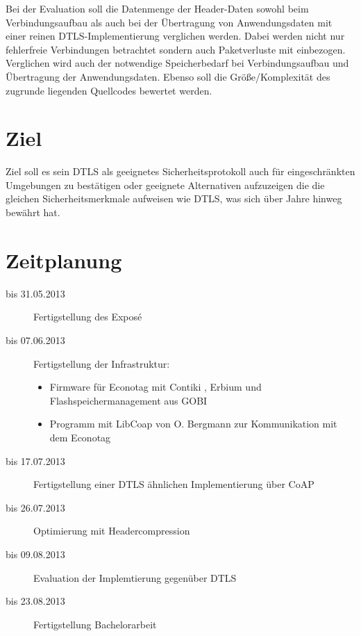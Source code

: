 \documentclass[a4paper,10pt]{report}
\begin{document}
Bei der Evaluation soll die Datenmenge der Header-Daten sowohl beim Verbindungsaufbau als auch bei der Übertragung von Anwendungsdaten
mit einer reinen DTLS-Implementierung verglichen werden. Dabei werden nicht nur fehlerfreie Verbindungen betrachtet sondern auch Paketverluste
mit einbezogen. Verglichen wird auch der notwendige Speicherbedarf bei Verbindungsaufbau und Übertragung der Anwendungsdaten.
Ebenso soll die Größe/Komplexität des zugrunde liegenden Quellcodes bewertet werden.

\section{Ziel}
Ziel soll es sein DTLS als geeignetes Sicherheitsprotokoll auch für eingeschränkten Umgebungen zu bestätigen oder geeignete Alternativen
aufzuzeigen die die gleichen Sicherheitsmerkmale aufweisen wie DTLS, was sich über Jahre hinweg bewährt hat.

\section{Zeitplanung}
\begin{description}
  \item[bis 31.05.2013] Fertigstellung des Exposé
  \item[bis 07.06.2013] Fertigstellung der Infrastruktur:
    \begin{itemize}
      \item Firmware für Econotag mit Contiki \cite{contiki}, Erbium \cite{erbium} und Flashspeichermanagement aus GOBI
      \item Programm mit LibCoap \cite{libcoap} von O. Bergmann zur Kommunikation mit dem Econotag
    \end{itemize}
  \item[bis 17.07.2013] Fertigstellung einer DTLS ähnlichen Implementierung über CoAP
  \item[bis 26.07.2013] Optimierung mit Headercompression
  \item[bis 09.08.2013] Evaluation der Implemtierung gegenüber DTLS
  \item[bis 23.08.2013] Fertigstellung Bachelorarbeit
\end{description}

\nocite{*}

\printbibliography
\end{document}

